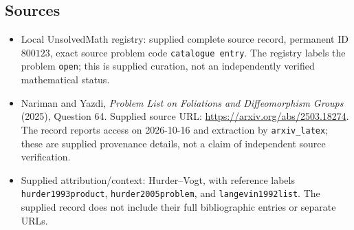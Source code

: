 \documentclass[11pt]{article}
\begin{document}
\subsection{Sources}
\begin{itemize}
\item Local UnsolvedMath registry: supplied complete source record, permanent ID \(800123\), exact source problem code \texttt{catalogue entry}. The registry labels the problem \texttt{open}; this is supplied curation, not an independently verified mathematical status.
\item Nariman and Yazdi, \emph{Problem List on Foliations and Diffeomorphism Groups} (2025), Question 64. Supplied source URL: \url{https://arxiv.org/abs/2503.18274}. The record reports access on 2026-10-16 and extraction by \texttt{arxiv\_latex}; these are supplied provenance details, not a claim of independent source verification.
\item Supplied attribution/context: Hurder--Vogt, with reference labels \texttt{hurder1993product}, \texttt{hurder2005problem}, and \texttt{langevin1992list}. The supplied record does not include their full bibliographic entries or separate URLs.
\end{itemize}
\end{document}
